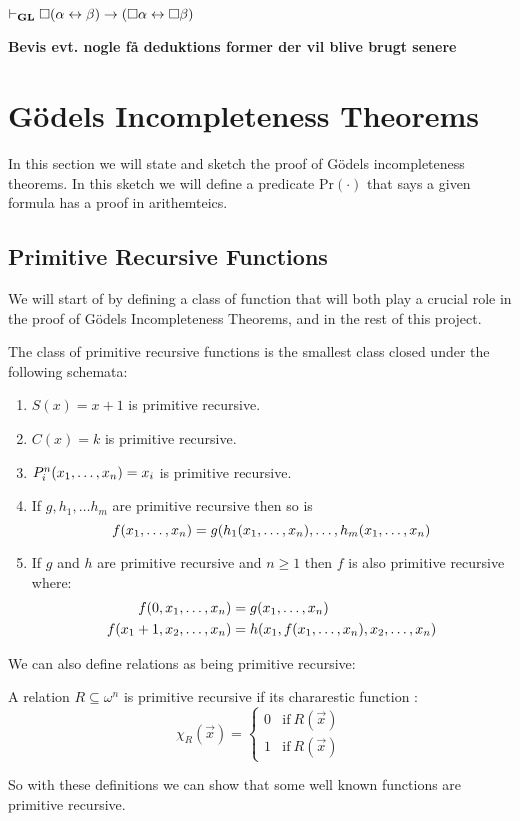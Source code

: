 \documentclass[../main.tex]{subfiles}
\begin{document}
\begin{prop}\label{prop:GL}
	$\vdash_{\text{\textbf{GL}}}\Box(\alpha\leftrightarrow\beta)\rightarrow(\Box\alpha\leftrightarrow\Box\beta)$
\end{prop}
\textbf{Bevis evt. nogle få deduktions former der vil blive brugt senere}



\section{Gödels Incompleteness Theorems}
In this section we will state and sketch the proof of Gödels incompleteness
theorems. In this sketch we will define a predicate $\text{Pr}(\cdot)$ that
says a given formula has a proof in arithemteics.


\subsection{Primitive Recursive Functions}
We will start of by defining a class of function that will both play a crucial
role in the proof of Gödels Incompleteness Theorems, and in the rest of this
project. 
\begin{defi}
	The class of primitive recursive functions is the smallest class closed
	under the following schemata:
	\begin{enumerate}[label=\Roman*.]
		\item $S(x)=x+1$ is primitive recursive.
		\item $C(x)=k$ is primitive recursive.
		\item $P^n_i(x_1,\ldots,x_n)=x_i$ is primitive recursive.
		\item If $g,h_1,\ldots h_m$ are primitive recursive then so
			is
			$$f(x_1,\ldots,x_n)=g(h_1(x_1,\ldots,x_n),\ldots,h_m(x_1,\ldots,x_n)$$
		\item If $g$ and $h$ are primitive recursive and $n\geq 1$ then
			$f$ is also primitive recursive where:
			\begin{align*}
				f(0,x_1,\ldots,x_n)&=g(x_1,\ldots,x_n)\\
				f(x_1+1,x_2,\ldots,x_n)&=h(x_1,f(x_1,\ldots,x_n),x_2,\ldots,x_n)
			\end{align*}
	\end{enumerate}
\end{defi}
We can also define relations as being primitive recursive:
\begin{defi}
	A relation $R\subseteq \omega^n$ is primitive recursive if its
	chararestic function :
	\[\chi_R(\vec{x})=\begin{cases}
		0 &\text{if}\ R(\vec{x})\\
		1 &\text{if}\ R(\vec x)
	\end{cases}\]
\end{defi}
So with these definitions we can show that some well known functions are
primitive recursive.
\end{document}
